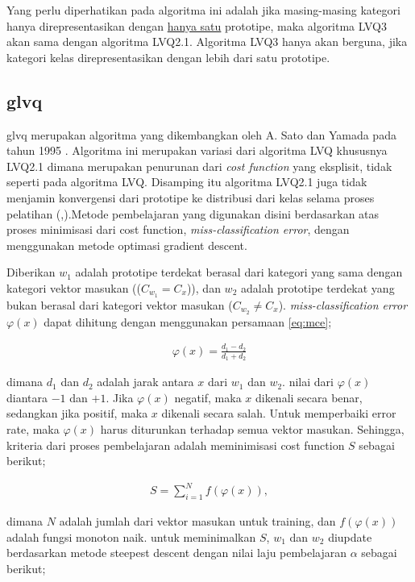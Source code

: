 Yang perlu diperhatikan pada algoritma ini adalah jika masing-masing kategori
hanya direpresentasikan dengan \underline{hanya satu} prototipe, maka algoritma
LVQ3 akan sama dengan algoritma LVQ2.1. Algoritma LVQ3 hanya akan berguna, jika
kategori kelas direpresentasikan dengan lebih dari satu prototipe. 

\subsection{\Gls{glvq}}

\Gls{glvq} merupakan algoritma yang dikembangkan oleh A. Sato dan Yamada pada
tahun 1995 \cite{Sato:1995}. Algoritma ini merupakan variasi dari algoritma LVQ
khususnya LVQ2.1 dimana merupakan penurunan dari \textit{cost function} yang
eksplisit, tidak seperti pada algoritma LVQ. Disamping itu algoritma LVQ2.1
juga tidak menjamin konvergensi dari prototipe ke distribusi dari kelas selama
proses pelatihan (\cite{Sato:1995},\cite{Sato:1998}).Metode pembelajaran yang 
digunakan disini berdasarkan atas proses minimisasi dari cost function,
\emph{miss-classification error}, dengan menggunakan metode optimasi gradient
descent.

Diberikan $w_1$ adalah prototipe terdekat berasal dari kategori
yang sama dengan kategori vektor masukan (($C_{w_1} = C_x$)), dan $w_2$ adalah
prototipe terdekat yang bukan berasal dari kategori vektor masukan ($C_{w_2} \neq
C_x$). \emph{miss-classification error} $\varphi(x)$ dapat dihitung dengan
menggunakan persamaan \ref{eq:mce};
 
\begin{align}
\label{eq:mce}
	\varphi(x) = \frac{d_1 - d_2}{d_1 + d_2}
\end{align}

\noindent dimana $d_1$ dan $d_2$ adalah jarak antara $x$ dari $w_1$ dan $w_2$.
nilai dari $\varphi(x)$ diantara $-1$ dan $+1$. Jika $\varphi(x)$ negatif, maka
$x$ dikenali secara benar, sedangkan jika positif, maka $x$ dikenali secara
salah. Untuk memperbaiki error rate, maka $\varphi(x)$ harus diturunkan terhadap
semua vektor masukan. Sehingga, kriteria dari proses pembelajaran adalah
meminimisasi cost function $S$ sebagai berikut;

\begin{align}
\label{eq:costS}
	S = \sum_{i=1}^{N} f(\varphi(x)), 
\end{align}

\noindent dimana $N$ adalah jumlah dari vektor masukan untuk training, dan
$f(\varphi(x))$ adalah fungsi monoton naik. untuk meminimalkan $S$, $w_1$ dan
$w_2$ diupdate berdasarkan metode steepest descent dengan nilai laju
pembelajaran $\alpha$ sebagai berikut;

